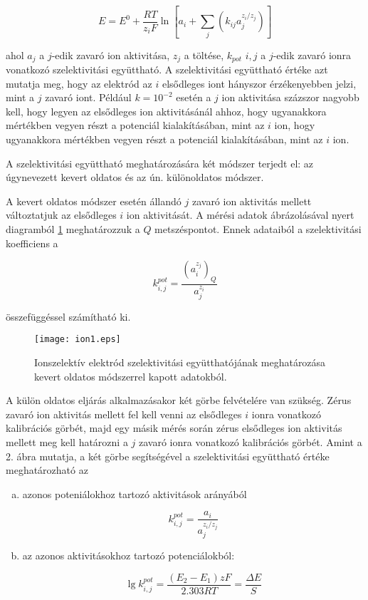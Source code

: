 \begin{equation}
\label{eq:nikolsky}
E=E^0 + \frac{RT}{z_iF} \ln \left [ a_i + \sum_{j} \left ( k_{ij}a_j^{z_i/z_j} \right ) \right ]
\end{equation}

ahol $a_j$ a $j$-edik zavaró ion aktivitása, $z_j$ a töltése, $k_{pot}$ $i, j$ a $j$-edik zavaró ionra vonatkozó szelektivitási együttható.
A szelektivitási együttható értéke azt mutatja meg, hogy az elektród az $i$ elsődleges iont hányszor érzékenyebben jelzi, mint a $j$ zavaró iont.
Például $k = 10^{-2}$ esetén a $j$ ion aktivitása százszor nagyobb kell, hogy legyen az elsődleges ion aktivitásánál ahhoz, hogy ugyanakkora mértékben vegyen részt a potenciál kialakításában, mint az $i$ ion, hogy ugyanakkora mértékben vegyen részt a potenciál kialakításában, mint az $i$ ion.

A szelektivitási együttható meghatározására két módszer terjedt el: az úgynevezett kevert oldatos és az ún. különoldatos módszer.

A kevert oldatos módszer esetén állandó $j$ zavaró ion aktivitás mellett változtatjuk az elsődleges $i$ ion aktivitását.
A mérési adatok ábrázolásával nyert diagramból \ref{fig:Q} meghatározzuk a $Q$ metszéspontot.
Ennek adataiból a szelektivitási koefficiens a

\begin{equation}
\label{eq:szel1}
	k_{i,j}^{pot}
	=
	\frac{(a_i^{z_j})_Q}{a_j^{z_i}}
\end{equation}

összefüggéssel számítható ki.

\begin{figure}
\centering
\texttt{[image: ion1.eps]}
\caption{Ionszelektív elektród szelektivitási együtthatójának meghatározása kevert oldatos módszerrel kapott adatokból.}
\label{fig:Q}
\end{figure}

A külön oldatos eljárás alkalmazásakor két görbe felvételére van szükség.
Zérus zavaró ion aktivitás mellett fel kell venni az elsődleges $i$ ionra vonatkozó kalibrációs görbét, majd egy másik mérés során zérus elsődleges ion aktivitás mellett meg kell határozni a $j$ zavaró ionra vonatkozó kalibrációs görbét.
Amint a 2. ábra mutatja, a két görbe segítségével a szelektivitási együttható értéke meghatározható az

\begin{enumerate}[(a)]
\item azonos poteniálokhoz tartozó aktivitások arányából

\begin{equation}
\label{eq:azonospot}
        k_{i,j}^{pot}
        =
        \frac{a_i}{a_j^{z_i/z_j}}
\end{equation}

\item az azonos aktivitásokhoz tartozó potenciálokból:

\begin{equation}
\label{eq:azonosakt}
        \lg k_{i,j}^{pot}
        =
        \frac{(E_2-E_1)zF}{2.303RT}
	=
	\frac{\Delta E}{S}
\end{equation}

\end{enumerate}

